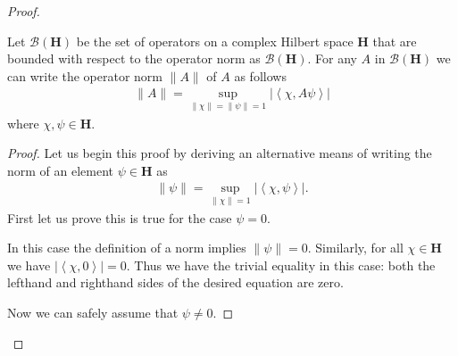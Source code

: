 \begin{proof}
\begin{lemma}
    \label{lmm:lemma-1}
    \leanok
    Let $\mathcal{B}(\mathbf{H})$ be the set of operators on a complex Hilbert space $\mathbf{H}$ that are bounded with respect to the operator norm as $\mathcal{B}(\mathbf{H})$. For any $A$ in $\mathcal{B}(\mathbf{H})$ we can write the operator norm $\|A\|$ of $A$ as follows
    \begin{align}
        \|A\| = \sup\limits_{\|\chi\| = \|\psi\| = 1} \lvert \left< \chi, A \psi \right> \rvert
    \end{align}
    where $\chi, \psi \in \mathbf{H}$.
\end{lemma}
\begin{proof}
    \leanok
Let us begin this proof by deriving an alternative means of writing the norm of an element $\psi \in \mathbf{H}$ as
\begin{align}
    \|\psi\| = \sup\limits_{\|\chi\| = 1} \lvert \left< \chi, \psi \right> \rvert.
\end{align}
First let us prove this is true for the case $\psi = 0$.

In this case the definition of a norm implies $\|\psi\| = 0$. Similarly, for all $\chi \in \mathbf{H}$ we have $\lvert \left< \chi, 0 \right> \rvert = 0$. Thus we have the trivial equality in this case: both the lefthand and righthand sides of the desired equation are zero.

Now we can safely assume that $\psi \neq 0$.


\end{proof}
\end{proof}
